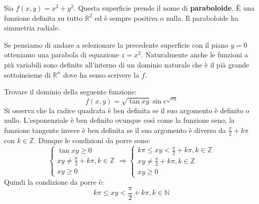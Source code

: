 \documentclass[a4paper]{article}
\numberwithin{equation}{subsection}
\begin{document}
\ex{}
{
    Sia $f(x,y) = x^2 + y^2$. Questa superficie prende il nome di \textbf{paraboloide}. È una funzione definita su tutto $\mathbb{R}^2$ ed è sempre
    positiva o nulla. Il paraboloide ha simmetria radiale. 
    \begin{figure}[H]
        \centering
    \end{figure}
}
\noindent
Se pensiamo di andare a selezionare la precedente superficie con il piano $y = 0$ otteniamo 
una parabola di equazione $z = x^2$.
Naturalmente anche le funzioni a più variabili sono definite all'interno di un dominio naturale che è 
il pià grande sottoinsieme di $\mathbb{R}^n$ dove ha senso scrivere la $f$. 
\ex{}
{
    Trovare il dominio della seguente funzione: 
    \[f(x,y) = \sqrt{\tan{xy}}\sin{e^{\sqrt{xy}}}\]
    Si osserva che la radice quadrata è ben definita se il suo argomento è definito o nullo. 
    L'esponenziale è ben definito ovunque così come la funzione seno; la funzione tangente invece è ben 
    definita se il suo argomento è diverso da $\frac{\pi}{2} + k\pi$ con $k \in \mathbb{Z}$. Dunque le condizioni
    da porre sono:
    \[
    \begin{cases}
        \tan{xy} \ge 0\\
        xy \neq \frac{\pi}{2} + k\pi, k \in \mathbb{Z}\\
        xy \ge 0 
    \end{cases} \Longrightarrow
    \begin{cases}
        k\pi \le xy < \frac{\pi}{2} + k\pi, k \in \mathbb{Z}\\
        xy \neq \frac{\pi}{2} + k\pi, k \in \mathbb{Z}\\
        xy \ge 0
    \end{cases}
    \]
    Quindi la condizione da porre è:
    \[k\pi \le xy < \frac{\pi}{2} + k\pi, k \in \mathbb{N}\]

}
\end{document}
